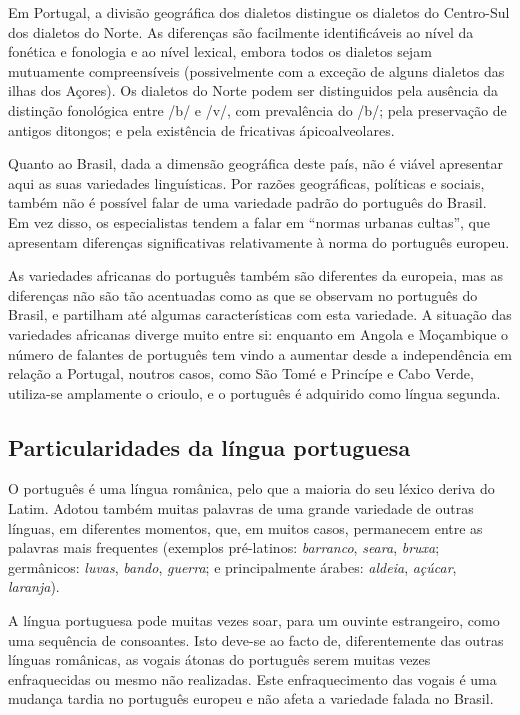 \begin{multicols}{2}
Em Portugal, a divisão geográfica dos dialetos\cite{cintra} distingue os dialetos do Centro-Sul dos dialetos do Norte. As diferenças são facilmente identificáveis ao nível da fonética e fonologia e ao nível lexical, embora todos os dialetos sejam mutuamente compreensíveis (possivelmente com a exceção de alguns dialetos das ilhas dos Açores). Os dialetos do Norte podem ser distinguidos pela ausência da distinção fonológica entre /b/ e /v/, com prevalência do /b/; pela preservação de antigos ditongos; e pela existência de fricativas ápicoalveolares. 

Quanto ao Brasil, dada a dimensão geográfica deste país, não é viável apresentar aqui as suas variedades linguísticas. Por razões geográficas, políticas e sociais, também não é possível falar de uma variedade padrão do português do Brasil. Em vez disso, os especialistas tendem a falar em “normas urbanas cultas”, que apresentam diferenças significativas relativamente à norma do português europeu. 

As variedades africanas do português também são diferentes da europeia, mas as diferenças não são tão acentuadas como as que se observam no português do Brasil, e partilham até algumas características com esta variedade. A situação das variedades africanas diverge muito entre si: enquanto em Angola e Moçambique o número de falantes de português tem vindo a aumentar desde a independência em relação a Portugal, noutros casos, como São Tomé e Princípe e Cabo Verde, utiliza-se amplamente o crioulo, e o português é adquirido como língua segunda.


\subsection{Particularidades da língua portuguesa}

O português é uma língua românica\cite{cardeira}, pelo que a maioria do seu léxico deriva do Latim. Adotou também muitas palavras de uma grande variedade de outras línguas, em diferentes momentos, que, em muitos casos, permanecem entre as palavras mais frequentes (exemplos pré-latinos: \textit{barranco}, \textit{seara}, \textit{bruxa}; germânicos: \textit{luvas}, \textit{bando}, \textit{guerra}; e principalmente árabes: \textit{aldeia}, \textit{açúcar}, \textit{laranja}).

A língua portuguesa pode muitas vezes soar, para um ouvinte estrangeiro, como uma sequência de consoantes. Isto deve-se ao facto de, diferentemente das outras línguas românicas, as vogais átonas do português serem muitas vezes enfraquecidas ou mesmo não realizadas. Este enfraquecimento das vogais é uma mudança tardia no português europeu e não afeta a variedade falada no Brasil.


\end{multicols}
